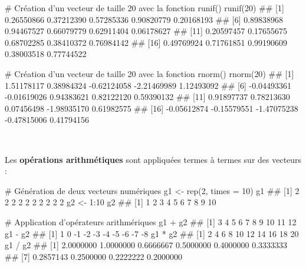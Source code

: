 \documentclass[12pt,twosided, notitlepage]{book}
\newenvironment{Shaded}{}{}
\newcommand{\KeywordTok}[1]{\textcolor[rgb]{0.00,0.00,1.00}{{#1}}}
\newcommand{\DataTypeTok}[1]{{#1}}
\newcommand{\DecValTok}[1]{{#1}}
\newcommand{\StringTok}[1]{\textcolor[rgb]{0.00,0.50,0.50}{{#1}}}
\newcommand{\CommentTok}[1]{\textcolor[rgb]{0.00,0.50,0.00}{{#1}}}
\newcommand{\NormalTok}[1]{{#1}}
\renewenvironment{Shaded}{\begin{snugshade}}{\end{snugshade}}
\begin{document}
\begin{Shaded}
\begin{Highlighting}[]
\CommentTok{# Création d'un vecteur de taille 20 avec la fonction runif()}
\KeywordTok{runif}\NormalTok{(}\DecValTok{20}\NormalTok{)}
  \NormalTok{##  [1] 0.26550866 0.37212390 0.57285336 0.90820779 0.20168193}
  \NormalTok{##  [6] 0.89838968 0.94467527 0.66079779 0.62911404 0.06178627}
  \NormalTok{## [11] 0.20597457 0.17655675 0.68702285 0.38410372 0.76984142}
  \NormalTok{## [16] 0.49769924 0.71761851 0.99190609 0.38003518 0.77744522}

\CommentTok{# Création d'un vecteur de taille 20 avec la fonction rnorm()}
\KeywordTok{rnorm}\NormalTok{(}\DecValTok{20}\NormalTok{)}
  \NormalTok{##  [1]  1.51178117  0.38984324 -0.62124058 -2.21469989  1.12493092}
  \NormalTok{##  [6] -0.04493361 -0.01619026  0.94383621  0.82122120  0.59390132}
  \NormalTok{## [11]  0.91897737  0.78213630  0.07456498 -1.98935170  0.61982575}
  \NormalTok{## [16] -0.05612874 -0.15579551 -1.47075238 -0.47815006  0.41794156}
\end{Highlighting}
\end{Shaded}

~

Les \textbf{opérations arithmétiques} sont appliquées termes à termes
sur des
vecteurs\index{\texttt{+}}\index{\texttt{-}}\index{\texttt{*}}\index{\texttt{/}}
:

\begin{Shaded}
\begin{Highlighting}[]
\CommentTok{# Génération de deux vecteurs numériques}
\NormalTok{g1 <-}\StringTok{ }\KeywordTok{rep}\NormalTok{(}\DecValTok{2}\NormalTok{, }\DataTypeTok{times =} \DecValTok{10}\NormalTok{)}
\NormalTok{g1}
  \NormalTok{##  [1] 2 2 2 2 2 2 2 2 2 2}
\NormalTok{g2 <-}\StringTok{ }\DecValTok{1}\NormalTok{:}\DecValTok{10}
\NormalTok{g2}
  \NormalTok{##  [1]  1  2  3  4  5  6  7  8  9 10}

\CommentTok{# Application d'opérateurs arithmériques}
\NormalTok{g1 +}\StringTok{ }\NormalTok{g2}
  \NormalTok{##  [1]  3  4  5  6  7  8  9 10 11 12}
\NormalTok{g1 -}\StringTok{ }\NormalTok{g2}
  \NormalTok{##  [1]  1  0 -1 -2 -3 -4 -5 -6 -7 -8}
\NormalTok{g1 *}\StringTok{ }\NormalTok{g2}
  \NormalTok{##  [1]  2  4  6  8 10 12 14 16 18 20}
\NormalTok{g1 /}\StringTok{ }\NormalTok{g2}
  \NormalTok{##  [1] 2.0000000 1.0000000 0.6666667 0.5000000 0.4000000 0.3333333}
  \NormalTok{##  [7] 0.2857143 0.2500000 0.2222222 0.2000000}
\end{Highlighting}
\end{Shaded}
\end{document}
